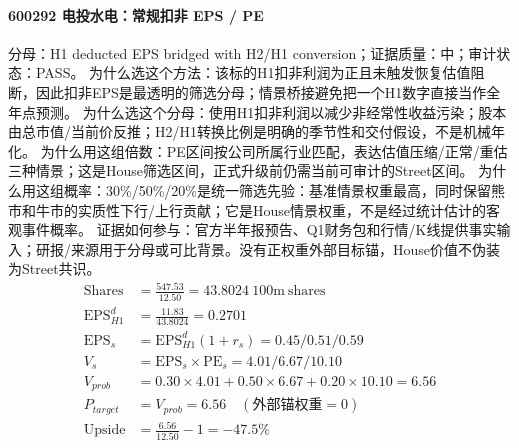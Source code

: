\paragraph{600292 电投水电：常规扣非 EPS / PE}
分母：H1 deducted EPS bridged with H2/H1 conversion；证据质量：中；审计状态：PASS。
为什么选这个方法：该标的H1扣非利润为正且未触发恢复估值阻断，因此扣非EPS是最透明的筛选分母；情景桥接避免把一个H1数字直接当作全年点预测。
为什么选这个分母：使用H1扣非利润以减少非经常性收益污染；股本由总市值/当前价反推；H2/H1转换比例是明确的季节性和交付假设，不是机械年化。
为什么用这组倍数：PE区间按公司所属行业匹配，表达估值压缩/正常/重估三种情景；这是House筛选区间，正式升级前仍需当前可审计的Street区间。
为什么用这组概率：30\%/50\%/20\%是统一筛选先验：基准情景权重最高，同时保留熊市和牛市的实质性下行/上行贡献；它是House情景权重，不是经过统计估计的客观事件概率。
证据如何参与：官方半年报预告、Q1财务包和行情/K线提供事实输入；研报/来源用于分母或可比背景。没有正权重外部目标锚，House价值不伪装为Street共识。
\begin{align*}
\mathrm{Shares} &= \frac{547.53}{12.50}=43.8024\ \mathrm{100m\ shares}\\
\mathrm{EPS}_{H1}^d &= \frac{11.83}{43.8024}=0.2701\\
\mathrm{EPS}_s &= \mathrm{EPS}_{H1}^d(1+r_s)=0.45/0.51/0.59\\
V_s &= \mathrm{EPS}_s\times \mathrm{PE}_s=4.01/6.67/10.10\\
V_{prob} &= 0.30\times 4.01+0.50\times 6.67+0.20\times 10.10=6.56\\
P_{target} &= V_{prob}=6.56\quad(\text{外部锚权重}=0)\\
\mathrm{Upside} &= \frac{6.56}{12.50}-1=-47.5\%\\
\end{align*}

